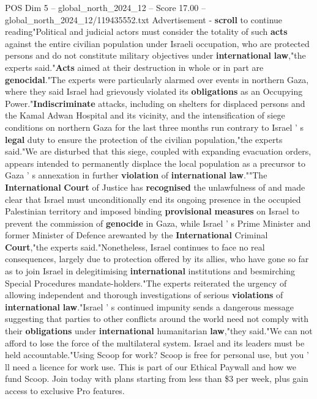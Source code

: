 \begin{textsample}{POS Dim 5 – global\_north\_2024\_12 – Score 17.00 – global\_north\_2024\_12/119435552.txt}
Advertisement - \textbf{scroll} to continue reading"Political and judicial actors must consider the totality of such \textbf{acts} against the entire civilian population under Israeli occupation, who are protected persons and do not constitute military objectives under \textbf{international} \textbf{law},"the experts said."\textbf{Acts} aimed at their destruction in whole or in part are \textbf{genocidal}."The experts were particularly alarmed over events in northern Gaza, where they said Israel had grievously violated its \textbf{obligations} as an Occupying Power."\textbf{Indiscriminate} attacks, including on shelters for displaced persons and the Kamal Adwan Hospital and its vicinity, and the intensification of siege conditions on northern Gaza for the last three months run contrary to Israel ' s \textbf{legal} duty to ensure the protection of the civilian population,"the experts said."We are disturbed that this siege, coupled with expanding evacuation orders, appears intended to permanently displace the local population as a precursor to Gaza ' s annexation in further \textbf{violation} of \textbf{international} \textbf{law}.""The \textbf{International} \textbf{Court} of Justice has \textbf{recognised} the unlawfulness of and made clear that Israel must unconditionally end its ongoing presence in the occupied Palestinian territory and imposed binding \textbf{provisional} \textbf{measures} on Israel to prevent the commission of \textbf{genocide} in Gaza, while Israel ' s Prime Minister and former Minister of Defence arewanted by the \textbf{International} Criminal \textbf{Court},"the experts said."Nonetheless, Israel continues to face no real consequences, largely due to protection offered by its allies, who have gone so far as to join Israel in delegitimising \textbf{international} institutions and besmirching Special Procedures mandate-holders."The experts reiterated the urgency of allowing independent and thorough investigations of serious \textbf{violations} of \textbf{international} \textbf{law}."Israel ' s continued impunity sends a dangerous message suggesting that parties to other conflicts around the world need not comply with their \textbf{obligations} under \textbf{international} humanitarian \textbf{law},"they said."We can not afford to lose the force of the multilateral system.
Israel and its leaders must be held accountable."Using Scoop for work?
Scoop is free for personal use, but you ' ll need a licence for work use.
This is part of our Ethical Paywall and how we fund Scoop.
Join today with plans starting from less than \$3 per week, plus gain access to exclusive Pro features.

\end{textsample}
